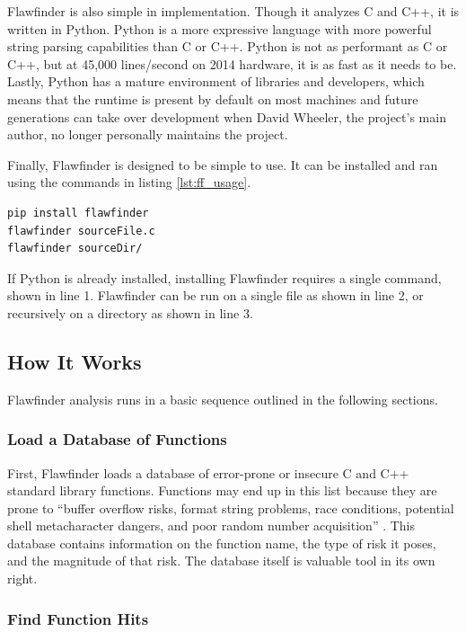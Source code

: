 \documentclass[journal]{IEEEtran}
\begin{document}
Flawfinder is also simple in implementation. Though it analyzes C and C++, it is written in Python.
Python is a more expressive language with more powerful string parsing capabilities than C or C++.
Python is not as performant as C or C++, but at 45,000 lines/second on 2014 hardware, it is as fast
as it needs to be. Lastly, Python has a mature environment of libraries and developers, which means
that the runtime is present by default on most machines and future generations can take over
development when David Wheeler, the project's main author, no longer personally maintains the
project.

Finally, Flawfinder is designed to be simple to use. It can be installed and ran using the commands
in listing \ref{lst:ff_usage}.

\begin{lstlisting}[language=sh, caption=Flawfinder Basic Usage, label=lst:ff_usage]
pip install flawfinder
flawfinder sourceFile.c
flawfinder sourceDir/
\end{lstlisting}

If Python is already installed, installing Flawfinder requires a single command, shown in line 1.
Flawfinder can be run on a single file as shown in line 2, or recursively on a directory as shown in
line 3.

\subsection{How It Works}

Flawfinder analysis runs in a basic sequence outlined in the following sections.

\subsubsection{Load a Database of Functions}

First, Flawfinder loads a database of error-prone or insecure C and C++ standard library functions.
Functions may end up in this list because they are prone to ``buffer overflow risks, format string
problems, race conditions, potential shell metacharacter dangers, and poor random number
acquisition'' \cite{flawfinder}. This database contains information on the function name, the type
of risk it poses, and the magnitude of that risk. The database itself is valuable tool in its own
right.

\subsubsection{Find Function Hits}
\end{document}
